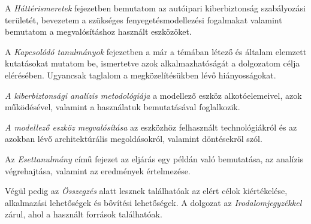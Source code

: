 A \textit{Háttérismeretek} fejezetben bemutatom az autóipari kiberbiztonság szabályozási területét, bevezetem a szükséges fenyegetésmodellezési fogalmakat valamint bemutatom a megvalósításhoz használt eszközöket.

A \textit{Kapcsolódó tanulmányok} fejezetben a már a témában létező és általam elemzett kutatásokat mutatom be, ismertetve azok alkalmazhatóságát a dolgozatom célja elérésében. Ugyancsak taglalom a megközelítésükben lévő hiányosságokat.

\textit{A kiberbiztonsági analízis metodológiája} a modellező eszköz alkotóelemeivel, azok működésével, valamint a használatuk bemutatásával foglalkozik. 

\textit{A modellező eszköz megvalósítása} az eszközhöz felhasznált technológiákról és az azokban lévő architektúrális megoldásokról, valamint döntésekről szól.

Az \textit{Esettanulmány} című fejezet az eljárás egy példán való bemutatása, az analízis végrehajtása, valamint az eredmények értelmezése.

Végül pedig az \textit{Összegzés} alatt lesznek találhatóak az elért célok kiértékelése, alkalmazási lehetőségek és bővítési lehetőségek. A dolgozat az \textit{Irodalomjegyzékkel} zárul, ahol a használt források találhatóak.



